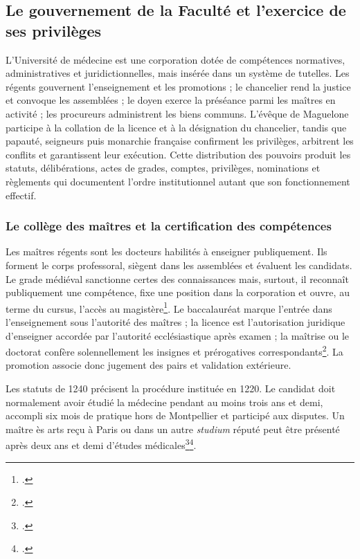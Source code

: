 \subsection{Le gouvernement de la Faculté et l'exercice de ses privilèges}
\label{sec:gouvernement-faculte}

L'Université de médecine est une corporation dotée de compétences normatives, administratives et juridictionnelles, mais insérée dans un système de tutelles. Les régents gouvernent l'enseignement et les promotions ; le chancelier rend la justice et convoque les assemblées ; le doyen exerce la préséance parmi les maîtres en activité ; les procureurs administrent les biens communs. L'évêque de Maguelone participe à la collation de la licence et à la désignation du chancelier, tandis que papauté, seigneurs puis monarchie française confirment les privilèges, arbitrent les conflits et garantissent leur exécution. Cette distribution des pouvoirs produit les statuts, délibérations, actes de grades, comptes, privilèges, nominations et règlements qui documentent l'ordre institutionnel autant que son fonctionnement effectif.

\subsubsection{Le collège des maîtres et la certification des compétences}

Les maîtres régents sont les docteurs habilités à enseigner publiquement. Ils forment le corps professoral, siègent dans les assemblées et évaluent les candidats. Le grade médiéval sanctionne certes des connaissances mais, surtout, il reconnaît publiquement une compétence, fixe une position dans la corporation et ouvre, au terme du cursus, l'accès au magistère\footcite{Verger2023Examens}. Le baccalauréat marque l'entrée dans l'enseignement sous l'autorité des maîtres ; la licence est l'autorisation juridique d'enseigner accordée par l'autorité ecclésiastique après examen ; la maîtrise ou le doctorat confère solennellement les insignes et prérogatives correspondants\footcite{Verger2023Examens}. La promotion associe donc jugement des pairs et validation extérieure.

Les statuts de 1240 précisent la procédure instituée en 1220. Le candidat doit normalement avoir étudié la médecine pendant au moins trois ans et demi, accompli six mois de pratique hors de Montpellier et participé aux disputes. Un maître ès arts reçu à Paris ou dans un autre \emph{studium} réputé peut être présenté après deux ans et demi d'études médicales\footcite{AHFMB1}\footcite{Statuts1240}.

